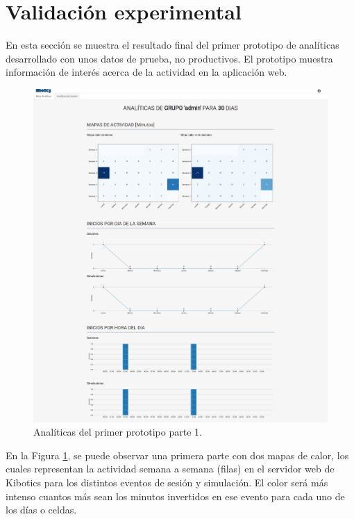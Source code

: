 \documentclass[a4paper, 12pt]{book}
\begin{document}
	\section{Validación experimental} 
	\label{sec:1_validacion_experimental} 
		En esta sección se muestra el resultado final del primer prototipo de analíticas  desarrollado con unos datos de prueba, no productivos. El prototipo muestra información de interés acerca de la actividad en la aplicación web.\\
		
		\begin{figure}[H]
			\centering
			\includegraphics[width=17cm, keepaspectratio]{img/primer_prototipo_1.png}
			\caption{Analíticas del primer prototipo parte 1.}
			\label{fig:primer_prototipo_1}
		\end{figure}

		
		En la Figura \ref{fig:primer_prototipo_1}, se puede observar una primera parte con dos mapas de calor, los cuales representan la actividad semana a semana (filas) en el servidor web de Kibotics para los distintos eventos de sesión y simulación. El color será más intenso cuantos más sean los minutos invertidos en ese evento para cada uno de los días o celdas.\\
		
\end{document}
